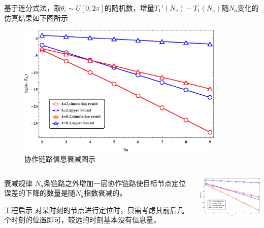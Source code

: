 \begin{frame}
基于连分式法，取$\theta_i \sim U[0,2\pi]$的随机数，增量$T_1'(N_a)-T_1(N_a)$随$N_a$变化的仿真结果如下图所示
\begin{figure}
  \centering
  \includegraphics[width=280pt]{decreasing_exponential.eps}
  \caption*{协作链路信息衰减图示}\label{fig:continuous_fraction_exponential}
\end{figure}
\end{frame}
\begin{frame}
\begin{columns}[c]
 \begin{column}{.5\textwidth} %
 \begin{block}{衰减规律}
$N_a$条链路之外增加一层协作链路使目标节点定位误差的下降的数量是随$N_a$\alert{指数衰减}的。
\end{block}
\begin{block}{工程启示}
对某时刻的节点进行定位时，只需考虑其前后几个时刻的位置即可，较远的时刻基本没有信息量。
\end{block}
\end{column}
    \begin{column}{.5\textwidth}
       \includegraphics[width=160pt]{decreasing_exponential.eps}
       \end{column}
    \end{columns}
\end{frame}
